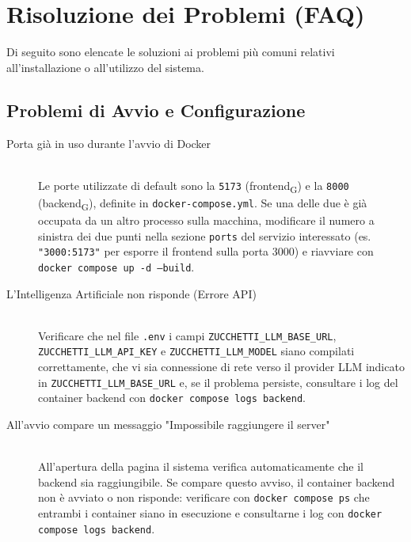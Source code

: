 \section{Risoluzione dei Problemi (FAQ)}
Di seguito sono elencate le soluzioni ai problemi più comuni relativi all'installazione o all'utilizzo del sistema.

\subsection{Problemi di Avvio e Configurazione}
\begin{description}
    \item[Porta già in uso durante l'avvio di Docker] \hfill \\
    Le porte utilizzate di default sono la \texttt{5173} (frontend\textsubscript{G}) e la \texttt{8000} (backend\textsubscript{G}), definite in \texttt{docker-compose.yml}.
    Se una delle due è già occupata da un altro processo sulla macchina, modificare il numero a sinistra dei due punti nella sezione
    \texttt{ports} del servizio interessato (es. \texttt{"3000:5173"} per esporre il frontend sulla porta 3000) e riavviare con
    \texttt{docker compose up -d --build}.
    
    \item[L'Intelligenza Artificiale non risponde (Errore API)] \hfill \\
    Verificare che nel file \texttt{.env} i campi \texttt{ZUCCHETTI\_LLM\_BASE\_URL}, \texttt{ZUCCHETTI\_LLM\_API\_KEY} e
    \texttt{ZUCCHETTI\_LLM\_MODEL} siano compilati correttamente, che vi sia connessione di rete verso il provider LLM indicato in
    \texttt{ZUCCHETTI\_LLM\_BASE\_URL} e, se il problema persiste, consultare i log del container backend con
    \texttt{docker compose logs backend}.

    \item[All'avvio compare un messaggio "Impossibile raggiungere il server"] \hfill \\
    All'apertura della pagina il sistema verifica automaticamente che il backend sia raggiungibile. Se compare questo avviso,
    il container backend non è avviato o non risponde: verificare con \texttt{docker compose ps} che entrambi i container siano
    in esecuzione e consultarne i log con \texttt{docker compose logs backend}.
\end{description}

